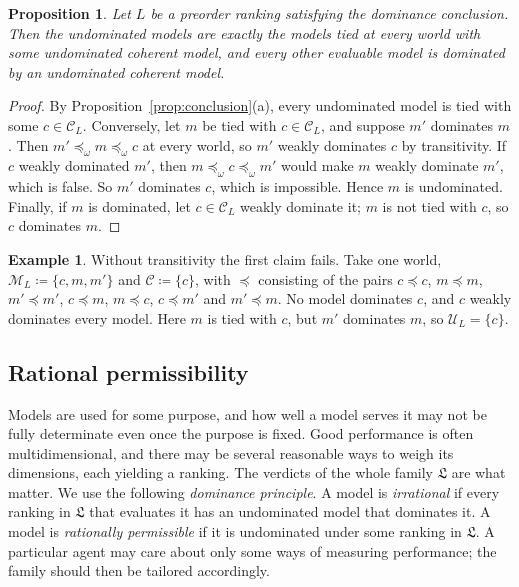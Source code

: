 \documentclass[11pt]{article}
\newtheorem{proposition}[theorem]{Proposition}
\theoremstyle{definition}
\newtheorem{example}[theorem]{Example}
\theoremstyle{remark}
\newcommand{\M}{\mathcal M}
\newcommand{\C}{\mathcal C}
\newcommand{\U}{\mathcal U}
\newcommand{\Lf}{\mathfrak L}
\begin{document}
\begin{proposition}\label{prop:profiles}
Let $L$ be a preorder ranking satisfying the dominance conclusion. Then the undominated models are exactly the models tied at every world with some undominated coherent model, and every other evaluable model is dominated by an undominated coherent model.
\end{proposition}
\begin{proof}
By Proposition~\ref{prop:conclusion}(a), every undominated model is tied with some $c\in\C_L$. Conversely, let $m$ be tied with $c\in\C_L$, and suppose $m'$ dominates $m$. Then $m'\preceq_\omega m\preceq_\omega c$ at every world, so $m'$ weakly dominates $c$ by transitivity. If $c$ weakly dominated $m'$, then $m\preceq_\omega c\preceq_\omega m'$ would make $m$ weakly dominate $m'$, which is false. So $m'$ dominates $c$, which is impossible. Hence $m$ is undominated. Finally, if $m$ is dominated, let $c\in\C_L$ weakly dominate it; $m$ is not tied with $c$, so $c$ dominates $m$.
\end{proof}

\begin{example}\label{ex:intransitive}
Without transitivity the first claim fails. Take one world, $\M_L\coloneqq\{c,m,m'\}$ and $\C\coloneqq\{c\}$, with $\preceq$ consisting of the pairs $c\preceq c$, $m\preceq m$, $m'\preceq m'$, $c\preceq m$, $m\preceq c$, $c\preceq m'$ and $m'\preceq m$. No model dominates $c$, and $c$ weakly dominates every model. Here $m$ is tied with $c$, but $m'$ dominates $m$, so $\U_L=\{c\}$.
\end{example}


\subsection{Rational permissibility}
Models are used for some purpose, and how well a model serves it may not be fully determinate even once the purpose is fixed. Good performance is often multidimensional, and there may be several reasonable ways to weigh its dimensions, each yielding a ranking. The verdicts of the whole family $\Lf$ are what matter. We use the following \emph{dominance principle}. A model is \emph{irrational} if every ranking in $\Lf$ that evaluates it has an undominated model that dominates it. A model is \emph{rationally permissible} if it is undominated under some ranking in $\Lf$. A particular agent may care about only some ways of measuring performance; the family should then be tailored accordingly.
\end{document}
